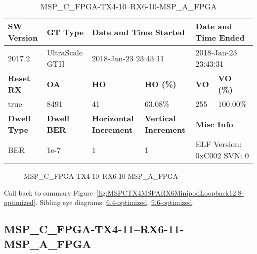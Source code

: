 \begin{table}[h]
\centering
\caption{MSP\_C\_FPGA-TX4-10--RX6-10-MSP\_A\_FPGA}
\label{tab:MSPCFPGATX410RX610MSPAFPGA12.8-optimized}
\begin{tabular}{@{}|l|l|l|l|l|l|@{}}
\toprule
\textbf{SW Version}                & \textbf{GT Type}   & \multicolumn{2}{l|}{\textbf{Date and Time Started}}            & \multicolumn{2}{l|}{\textbf{Date and Time Ended}}        \\ \midrule
2017.2                       & UltraScale GTH          & \multicolumn{2}{l|}{2018-Jan-23 23:43:11}                   & \multicolumn{2}{l|}{2018-Jan-23 23:43:31}               \\ \midrule
\textbf{Reset RX}                  & \textbf{OA} & \textbf{HO}   & \textbf{HO (\%)} & \textbf{VO} & \textbf{VO (\%)} \\ \midrule
true & 8491        & 41          & 63.08\%        & 255        & 100.00\%       \\ \midrule
\textbf{Dwell Type}                & \textbf{Dwell BER} & \textbf{Horizontal Increment} & \textbf{Vertical Increment}    & \multicolumn{2}{l|}{\textbf{Misc Info}}                  \\ \midrule
BER                            & 1e-7        & 1        & 1           & \multicolumn{2}{l|}{ELF Version: 0xC002 SVN: 0}                         \\ \bottomrule
\end{tabular}
\end{table}

\begin{figure}[h]
\caption{MSP\_C\_FPGA-TX4-10--RX6-10-MSP\_A\_FPGA} \label{fig:MSPCFPGATX410RX610MSPAFPGA12.8-optimized}
\end{figure}

Call back to summary Figure~\ref{fig:MSPCTX4MSPARX6MinipodLoopback12.8-optimized}.
Sibling eye diagrams: \hyperref[sec:MSPCFPGATX410RX610MSPAFPGA6.4-optimized]{6.4-optimized}, \hyperref[sec:MSPCFPGATX410RX610MSPAFPGA9.6-optimized]{9.6-optimized}.

\clearpage
\newpage


\subsection{MSP\_C\_FPGA-TX4-11--RX6-11-MSP\_A\_FPGA}\label{sec:MSPCFPGATX411RX611MSPAFPGA12.8-optimized}

